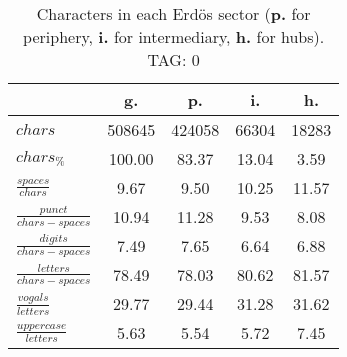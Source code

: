 \begin{table}[h!]
\begin{center}
\begin{tabular}{| l || c | c | c | c |}\hline
 & {\bf g.} & {\bf p.} & {\bf i.} & {\bf h.} \\\hline\hline
$chars$ & 508645  & 424058  & 66304  & 18283 \\
$chars_{\%}$ & 100.00  & 83.37  & 13.04  & 3.59 \\\hline
$\frac{spaces}{chars}$ & 9.67  & 9.50  & 10.25  & 11.57 \\
$\frac{punct}{chars-spaces}$ & 10.94  & 11.28  & 9.53  & 8.08 \\
$\frac{digits}{chars-spaces}$ & 7.49  & 7.65  & 6.64  & 6.88 \\\hline
$\frac{letters}{chars-spaces}$ & 78.49  & 78.03  & 80.62  & 81.57 \\
$\frac{vogals}{letters}$ & 29.77  & 29.44  & 31.28  & 31.62 \\
$\frac{uppercase}{letters}$ & 5.63  & 5.54  & 5.72  & 7.45 \\\hline
\end{tabular}
\caption{Characters in each Erd\"os sector ({{\bf p.}} for periphery, {{\bf i.}} for intermediary, 
    {{\bf h.}} for hubs). TAG: 0}
\end{center}
\end{table}